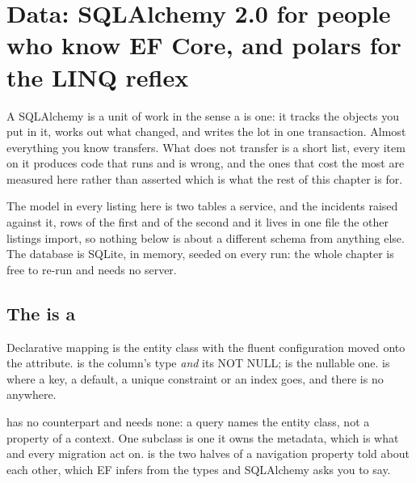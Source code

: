 
\chapter{Data: SQLAlchemy 2.0 for people who know EF Core, and polars for the LINQ reflex}
\label{ch:data}

\noindent
A SQLAlchemy  is a unit of work in the sense a 
is one: it tracks the objects you put in it, works out what changed, and
writes the lot in one transaction. Almost everything you know transfers. What
does not transfer is a short list, every item on it produces code that runs
and is wrong, and the ones that cost the most are measured here rather than
asserted \dash{} which is what the rest of this chapter is for.

The model in every listing here is two tables \dash{} a service, and the
incidents raised against it,  rows of the first and
 of the second \dash{} and it lives in one file the other
listings import, so nothing below is about a different schema from anything
else. The database is SQLite, in memory, seeded on every run: the whole
chapter is free to re-run and needs no server.

\section{The  is a }
\label{sec:ch10-session}

Declarative mapping is the entity class with the fluent configuration moved
onto the attribute.  is the column's type \emph{and} its
NOT NULL;  is the nullable one.
 is where a key, a default, a unique constraint or an
index goes, and there is no  anywhere.


\begin{csbox}
 has no counterpart and needs none: a query
names the entity class, not a property of a context. One
 subclass is one  \dash{} it owns the
metadata, which is what  and every migration
act on.  is the two halves of a navigation property
told about each other, which EF infers from the types and SQLAlchemy asks
you to say.
\end{csbox}

